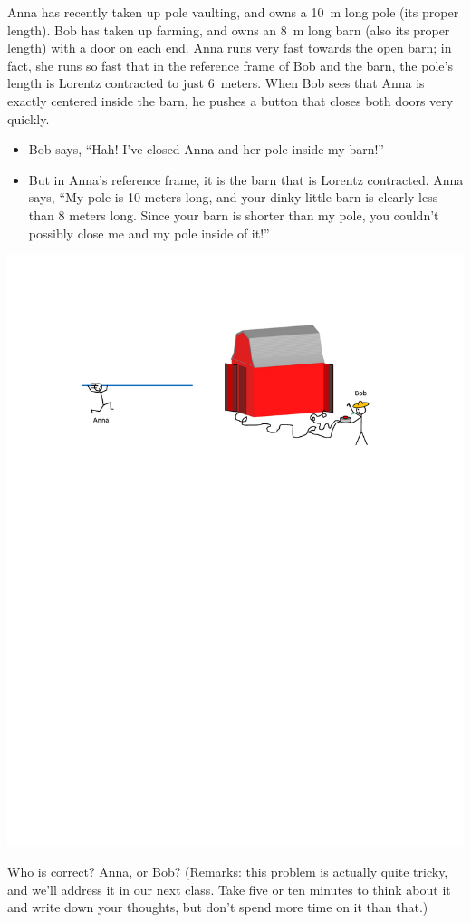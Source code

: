 \begin{Exercise}[difficulty=0]
Anna has recently taken up pole vaulting, and owns a 10~m long pole (its proper length).  Bob has taken up farming, and owns an 8~m long barn (also its proper length) with a door on each end.  Anna runs very fast towards the open barn; in fact, she runs so fast that in the reference frame of Bob and the barn, the pole's length is Lorentz contracted to just 6~meters.  When Bob sees that Anna is exactly centered inside the barn, he pushes a button that closes both doors very quickly.  
\begin{itemize}
\item Bob says, ``Hah! I've closed Anna and her pole inside my barn!''  
\item But in Anna's reference frame, it is the barn that is Lorentz contracted.  Anna says, ``My pole is 10 meters long, and your dinky little barn is clearly less than 8 meters long.  Since your barn is shorter than my pole, you couldn't possibly close me and my pole inside of it!''
\end{itemize}
\begin{center}
\includegraphics[scale=0.85]{M_problems/velocities_causality/pole_and_barn_color.pdf}
\end{center}
Who is correct?  Anna, or Bob?  (Remarks: this problem is actually quite tricky, and we'll address it in our next class.  Take five or ten minutes to think about it and write down your thoughts, but don't spend more time on it than that.)
\end{Exercise}



